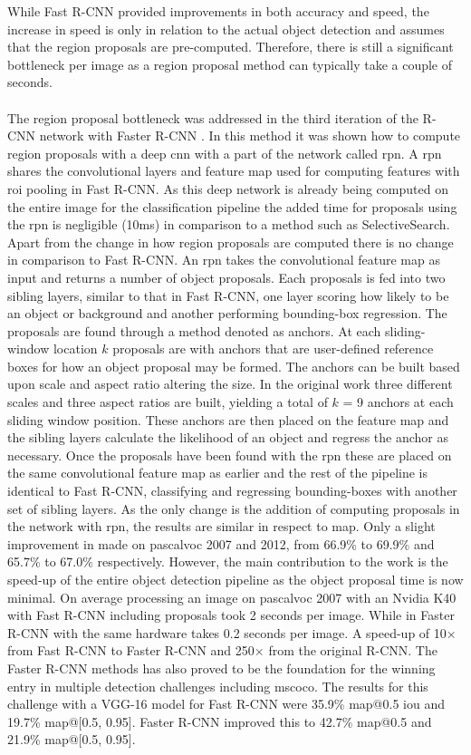 While Fast R-CNN provided improvements in both accuracy and speed, the increase in speed is only in relation to the actual object detection and assumes that the region proposals are pre-computed. Therefore, there is still a significant bottleneck per image as a region proposal method can typically take a couple of seconds. 
\\\\
The region proposal bottleneck was addressed in the third iteration of the R-CNN network with Faster R-CNN \cite{fasterrcnn}. In this method it was shown how to compute region proposals with a deep \gls{cnn} with a part of the network called \gls{rpn}. A \gls{rpn} shares the convolutional layers and feature map used for computing features with \gls{roi} pooling in Fast R-CNN. As this deep network is already being computed on the entire image for the classification pipeline the added time for proposals using the \gls{rpn} is negligible (10ms) in comparison to a method such as SelectiveSearch. Apart from the change in how region proposals are computed there is no change in comparison to Fast R-CNN. 
An \gls{rpn} takes the convolutional feature map as input and returns a number of object proposals. Each proposals is fed into two sibling layers, similar to that in Fast R-CNN, one layer scoring how likely to be an object or background and another performing bounding-box regression. The proposals are found through a method denoted as anchors. At each sliding-window location $k$ proposals are with anchors that are user-defined reference boxes for how an object proposal may be formed. The anchors can be built based upon scale and aspect ratio altering the size. In the original work three different scales and three aspect ratios are built, yielding a total of $k$ = 9 anchors at each sliding window position. These anchors are then placed on the feature map and the sibling layers calculate the likelihood of an object and regress the anchor as necessary.  
Once the proposals have been found with the \gls{rpn} these are placed on the same convolutional feature map as earlier and the rest of the pipeline is identical to Fast R-CNN, classifying and regressing bounding-boxes with another set of sibling layers. As the only change is the addition of computing proposals in the network with \gls{rpn}, the results are similar in respect to \gls{map}. Only a slight improvement in made on \gls{pascalvoc} 2007 and 2012, from 66.9\% to 69.9\% and 65.7\% to 67.0\% respectively. However, the main contribution to the work is the speed-up of the entire object detection pipeline as the object proposal time is now minimal. On average processing an image on \gls{pascalvoc} 2007 with an Nvidia K40 with Fast R-CNN including proposals took 2 seconds per image. While in Faster R-CNN with the same hardware takes 0.2 seconds per image. A speed-up of 10$\times$ from Fast R-CNN to Faster R-CNN and 250$\times$ from the original R-CNN. The Faster R-CNN methods has also proved to be the foundation for the winning entry in multiple detection challenges including \gls{mscoco}. The results for this challenge with a VGG-16 model for Fast R-CNN were 35.9\% \gls{map}@0.5 \gls{iou} and 19.7\% \gls{map}@[0.5, 0.95]. Faster R-CNN improved this to 42.7\% \gls{map}@0.5 and 21.9\% \gls{map}@[0.5, 0.95].
